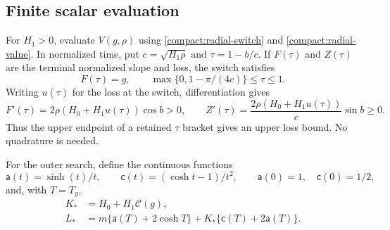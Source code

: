\subsection{Finite scalar evaluation}
For $H_1>0$, evaluate $V(g,\rho)$ using
\eqref{compact:radial-switch} and \eqref{compact:radial-value}.
In normalized time, put $c=\sqrt{H_1\rho}$ and $\tau=1-b/c$.
If $F(\tau)$ and $Z(\tau)$ are the terminal normalized slope and loss,
the switch satisfies
\begin{equation}\label{boundarygap:switch}
 F(\tau)=g,
 \qquad \max\{0,1-\pi/(4c)\}\le\tau\le1.
\end{equation}
Writing $u(\tau)$ for the loss at the switch, differentiation gives
\begin{equation}\label{boundarygap:switch-derivatives}
 F'(\tau)=2\rho(H_0+H_1u(\tau))\cos b>0,
 \qquad
 Z'(\tau)=\frac{2\rho(H_0+H_1u(\tau))}{c}\sin b\ge0.
\end{equation}
Thus the upper endpoint of a retained $\tau$ bracket gives an upper
loss bound. No quadrature is needed.

For the outer search, define the continuous functions
\[
 \mathsf a(t)=\sinh(t)/t,\qquad
 \mathsf c(t)=(\cosh t-1)/t^2,\qquad
 \mathsf a(0)=1,\quad\mathsf c(0)=1/2,
\]
and, with $T=T_g$,
\begin{equation}\label{compact:scalar-constants}
 \begin{aligned}
 K_*&=H_0+H_1\mathcal C(g),\\
 L_*&=m\{\mathsf a(T)+2\cosh T\}
       +K_*\{\mathsf c(T)+2\mathsf a(T)\}.
 \end{aligned}
\end{equation}

